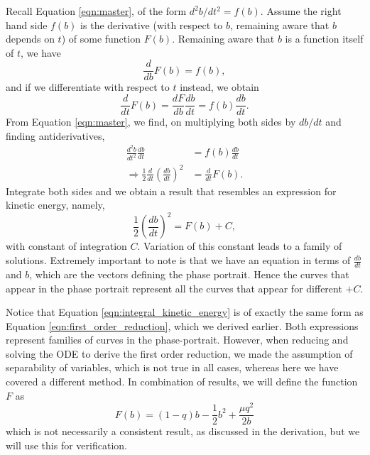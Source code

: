 \documentclass{report}
\begin{document}
Recall Equation \ref{eqn:master}, of the form $d^2b/dt^2 = f(b)$.
Assume the right hand side $f(b)$ is the derivative (with respect to $b$, remaining aware that $b$ depends on $t$) of some function $F(b)$.
Remaining aware that $b$ is a function itself of $t$, we have
\begin{equation}
    \frac{d}{db}F(b) = f(b),
\end{equation}
and if we differentiate with respect to $t$ instead, we obtain
\begin{equation}
    \frac{d}{dt}F(b) = \frac{dF}{db}\frac{db}{dt} = f(b)\frac{db}{dt}.
\end{equation}
From Equation \ref{eqn:master}, we find, on multiplying both sides by $db/dt$ and finding antiderivatives,
\begin{align}
    \frac{d^2b}{dt^2} \frac{db}{dt}                                   & = f(b) \frac{db}{dt} \\
    \Rightarrow \frac{1}{2}\frac{d}{dt}\left( \frac{db}{dt} \right)^2 & = \frac{d}{dt}F(b).
\end{align}
Integrate both sides and we obtain a result that resembles an expression for kinetic energy, namely,
\begin{equation}
    \frac{1}{2}\left(\frac{db}{dt}\right)^2 = F(b) + C,
    \label{eqn:integral_kinetic_energy}
\end{equation}
with constant of integration $C$. Variation of this constant leads to a family of solutions.
Extremely important to note is that we have an equation in terms of $\frac{db}{dt}$ and $b$, which are the vectors defining the phase portrait.
Hence the curves that appear in the phase portrait represent all the curves that appear for different $+C$.


Notice that Equation \ref{eqn:integral_kinetic_energy} is of exactly the same form as Equation \ref{eqn:first_order_reduction},
which we derived earlier.
Both expressions represent families of curves in the phase-portrait.
However, when reducing and solving the ODE to derive the first order reduction, we made the assumption of separability of variables,
which is not true in all cases,
whereas here we have covered a different method.
In combination of results, we will define the function $F$ as
\begin{equation}
    F(b) = (1-q)b - \frac{1}{2}b^2 + \frac{\mu q^2}{2b}
    \label{eqn:integral_curve_supposed}
\end{equation}
which is not necessarily a consistent result, as discussed in the derivation, but we will use this for verification.
\end{document}
